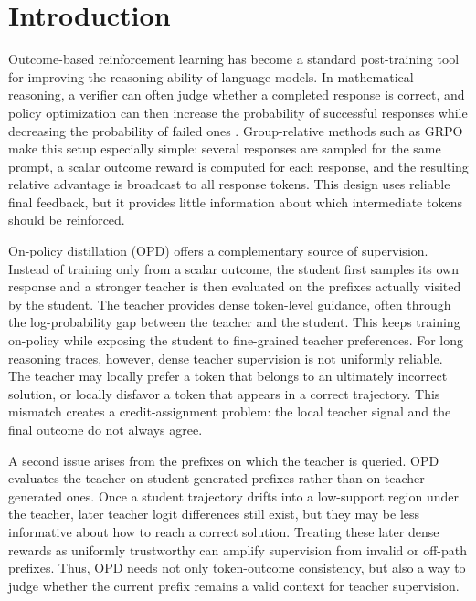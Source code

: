 \section{Introduction}

Outcome-based reinforcement learning has become a standard post-training tool for improving the reasoning ability of language models. In mathematical reasoning, a verifier can often judge whether a completed response is correct, and policy optimization can then increase the probability of successful responses while decreasing the probability of failed ones \cite{schulman2017proximal,ouyang2022training,shao2024deepseekmath,guo2025deepseekr1}. Group-relative methods such as GRPO make this setup especially simple: several responses are sampled for the same prompt, a scalar outcome reward is computed for each response, and the resulting relative advantage is broadcast to all response tokens. This design uses reliable final feedback, but it provides little information about which intermediate tokens should be reinforced.

On-policy distillation (OPD) offers a complementary source of supervision. Instead of training only from a scalar outcome, the student first samples its own response and a stronger teacher is then evaluated on the prefixes actually visited by the student. The teacher provides dense token-level guidance, often through the log-probability gap between the teacher and the student. This keeps training on-policy while exposing the student to fine-grained teacher preferences. For long reasoning traces, however, dense teacher supervision is not uniformly reliable. The teacher may locally prefer a token that belongs to an ultimately incorrect solution, or locally disfavor a token that appears in a correct trajectory. This mismatch creates a credit-assignment problem: the local teacher signal and the final outcome do not always agree.

A second issue arises from the prefixes on which the teacher is queried. OPD evaluates the teacher on student-generated prefixes rather than on teacher-generated ones. Once a student trajectory drifts into a low-support region under the teacher, later teacher logit differences still exist, but they may be less informative about how to reach a correct solution. Treating these later dense rewards as uniformly trustworthy can amplify supervision from invalid or off-path prefixes. Thus, OPD needs not only token-outcome consistency, but also a way to judge whether the current prefix remains a valid context for teacher supervision.

